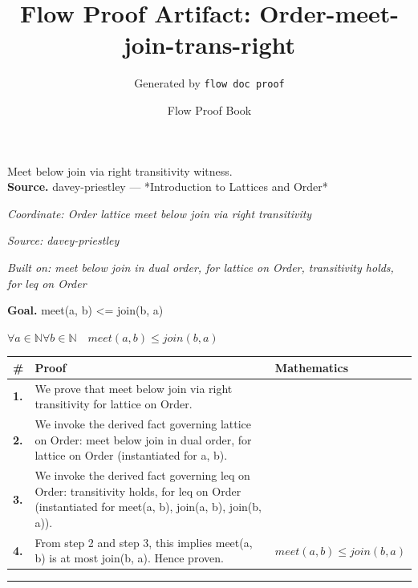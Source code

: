 \documentclass[11pt]{article}
\title{Flow Proof Artifact: Order-meet-join-trans-right}
\author{Generated by \texttt{flow doc proof}}
\date{Flow Proof Book}
\theoremstyle{definition}
\begin{document}
\maketitle
Meet below join via right transitivity witness.\\[0.5em]
\textbf{Source.} davey-priestley — *Introduction to Lattices and Order*\\[0.5em]
\bigskip
{}\par
\smallskip\noindent\textit{Coordinate: Order \cdot lattice \cdot meet below join via right transitivity}\par
\smallskip\noindent\textit{Source: davey-priestley}\par
\smallskip\noindent\textit{Built on: meet below join in dual order, for lattice on Order, transitivity holds, for leq on Order}\par
\medskip
\noindent\textbf{Goal.} meet(a, b) <= join(b, a)\par
\noindent$\displaystyle \forall a \in \mathbb{N} \forall b \in \mathbb{N}\quad meet(a, b) \le join(b, a)$\par
\medskip
\noindent
\begin{tabular}{@{} >{\raggedright\arraybackslash}p{} >{\raggedright\arraybackslash}p{} >{\raggedleft\arraybackslash}p{} @{}}
\textbf{\#} & \textbf{Proof} & \textbf{Mathematics} \\
\midrule
\textbf{1.} & We prove that meet below join via right transitivity for lattice on Order. & \\[0.45em]
\textbf{2.} & We invoke the derived fact governing lattice on Order: meet below join in dual order, for lattice on Order (instantiated for a, b). & \\[0.45em]
\textbf{3.} & We invoke the derived fact governing leq on Order: transitivity holds, for leq on Order (instantiated for meet(a, b), join(a, b), join(b, a)). & \\[0.45em]
\textbf{4.} & From step 2 and step 3, this implies meet(a, b) is at most join(b, a). Hence proven. & $\displaystyle meet(a, b) \le join(b, a)$ \\[0.45em]
\bottomrule
\end{tabular}
\label{thm:Order-lattice-meet_below_join_via_right_transitivity}
\par\medskip\hrule
\end{document}
